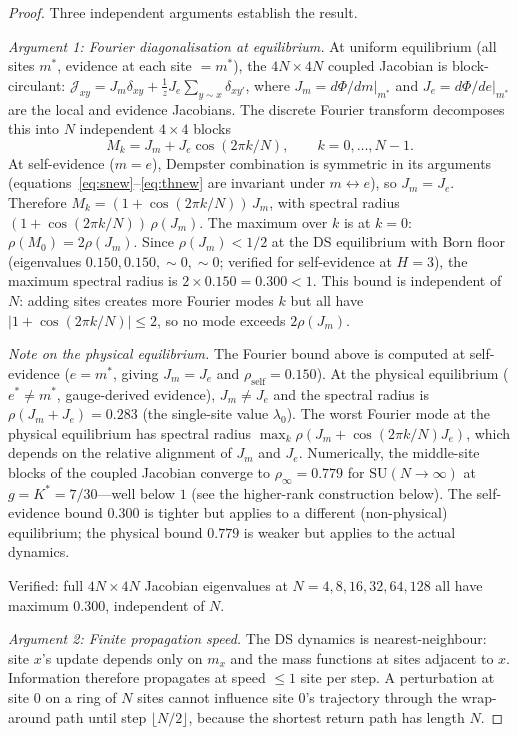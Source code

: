 \documentclass[11pt,a4paper]{article}
\theoremstyle{definition}
\theoremstyle{remark}
\newcommand{\SU}{\mathrm{SU}}
\begin{document}
\begin{proof}
Three independent arguments establish the result.

\emph{Argument 1: Fourier diagonalisation at equilibrium.} At uniform equilibrium (all sites $m^*$, evidence at each site $=m^*$), the $4N\times 4N$ coupled Jacobian is block-circulant: $\mathcal{J}_{xy}=J_m\delta_{xy}+\frac{1}{z}J_e\sum_{y\sim x}\delta_{xy'}$, where $J_m=d\Phi/dm|_{m^*}$ and $J_e=d\Phi/de|_{m^*}$ are the local and evidence Jacobians. The discrete Fourier transform decomposes this into $N$ independent $4\times 4$ blocks
\[
M_k=J_m+J_e\cos(2\pi k/N),\qquad k=0,\ldots,N-1.
\]
At self-evidence ($m=e$), Dempster combination is symmetric in its arguments (equations~\ref{eq:snew}--\ref{eq:thnew} are invariant under $m\leftrightarrow e$), so $J_m=J_e$. Therefore $M_k=(1+\cos(2\pi k/N))\,J_m$, with spectral radius $(1+\cos(2\pi k/N))\,\rho(J_m)$. The maximum over $k$ is at $k=0$: $\rho(M_0)=2\rho(J_m)$. Since $\rho(J_m)<1/2$ at the DS equilibrium with Born floor (eigenvalues $0.150, 0.150, \sim\!0, \sim\!0$; verified for self-evidence at $H=3$), the maximum spectral radius is $2\times 0.150=0.300<1$. This bound is independent of $N$: adding sites creates more Fourier modes $k$ but all have $|1+\cos(2\pi k/N)|\leq 2$, so no mode exceeds $2\rho(J_m)$.

\emph{Note on the physical equilibrium.} The Fourier bound above is computed at self-evidence ($e=m^*$, giving $J_m=J_e$ and $\rho_{\mathrm{self}}=0.150$). At the physical equilibrium ($e^*\neq m^*$, gauge-derived evidence), $J_m\neq J_e$ and the spectral radius is $\rho(J_m+J_e)=0.283$ (the single-site value $\lambda_0$). The worst Fourier mode at the physical equilibrium has spectral radius $\max_k\rho(J_m+\cos(2\pi k/N)J_e)$, which depends on the relative alignment of $J_m$ and $J_e$. Numerically, the middle-site blocks of the coupled Jacobian converge to $\rho_\infty=0.779$ for $\SU(N\to\infty)$ at $g=K^*=7/30$---well below $1$ (see the higher-rank construction below). The self-evidence bound $0.300$ is tighter but applies to a different (non-physical) equilibrium; the physical bound $0.779$ is weaker but applies to the actual dynamics.

Verified: full $4N\times 4N$ Jacobian eigenvalues at $N=4,8,16,32,64,128$ all have maximum $0.300$, independent of $N$.

\emph{Argument 2: Finite propagation speed.} The DS dynamics is nearest-neighbour: site $x$'s update depends only on $m_x$ and the mass functions at sites adjacent to $x$. Information therefore propagates at speed $\leq 1$ site per step. A perturbation at site $0$ on a ring of $N$ sites cannot influence site $0$'s trajectory through the wrap-around path until step $\lfloor N/2\rfloor$, because the shortest return path has length $N$.


\end{proof}
\end{document}
